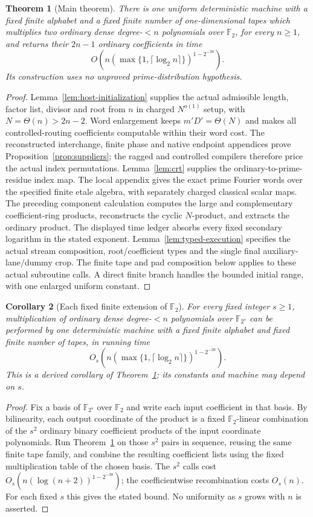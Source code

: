 \documentclass[11pt]{article}
\newtheorem{theorem}{Theorem}
\newtheorem{corollary}[theorem]{Corollary}
\newcommand{\F}{\mathbb F}
\begin{document}
\begin{theorem}[Main theorem]
\label{thm:main}
There is one uniform deterministic machine with a fixed finite alphabet
and a fixed finite number of one-dimensional tapes which multiplies two
ordinary dense degree-$<n$ polynomials over $\F_2$, for every $n\ge1$,
and returns their $2n-1$ ordinary coefficients in time
\[
 O\!\left(n(\max\{1,\lceil\log_2 n\rceil\})^{1-2^{-38}}\right).
\]
Its construction uses no unproved prime-distribution hypothesis.
\end{theorem}
\begin{proof}
Lemma~\ref{lem:host-initialization} supplies the actual admissible length,
factor list, divisor and root from $n$ in charged $N^{o(1)}$ setup,
with $N=\Theta(n)>2n-2$. Word enlargement keeps $m'D'=\Theta(N)$ and makes
all controlled-routing coefficients computable within their word cost.
The reconstructed interchange, finite phase and native endpoint
appendices prove Proposition~\ref{prop:suppliers}; the ragged and
controlled compilers therefore price the actual index permutations.
Lemma~\ref{lem:crt} supplies the ordinary-to-prime-residue index map.
The local appendix gives the exact prime Fourier words over the
specified finite etale algebra, with separately charged classical scalar
maps. The preceding component calculation computes the large and
complementary coefficient-ring products, reconstructs the cyclic
$N$-product, and extracts the ordinary product. The displayed time
ledger absorbs every fixed secondary logarithm in the stated exponent.
Lemma~\ref{lem:typed-execution} specifies the actual stream composition,
root/coefficient types and the single final auxiliary-lane/dummy crop.
The finite tape and pad composition below applies to these actual
subroutine calls. A direct finite branch handles the bounded initial
range, with one enlarged uniform constant.
\end{proof}

\begin{corollary}[Each fixed finite extension of $\F_2$]
For every fixed integer $s\ge 1$, multiplication of ordinary dense
degree-$<n$ polynomials over $\F_{2^s}$ can be performed by one
deterministic machine with a fixed finite alphabet and fixed finite
number of tapes, in running time
\[
 O_s\!\left(n(\max\{1,\lceil\log_2 n\rceil\})^{1-2^{-38}}\right).
\]
This is a derived corollary of Theorem~\ref{thm:main}; its constants and
machine may depend on $s$.
\end{corollary}
\begin{proof}
Fix a basis of $\F_{2^s}$ over $\F_2$ and write each input coefficient
in that basis. By bilinearity, each output coordinate of the product is
a fixed $\F_2$-linear combination of the $s^2$ ordinary binary
coefficient products of the input coordinate polynomials. Run
Theorem~\ref{thm:main} on those $s^2$ pairs in sequence, reusing the
same finite tape family, and combine the resulting coefficient lists
using the fixed multiplication table of the chosen basis. The $s^2$
calls cost $O_s(n(\log(n+2))^{1-2^{-38}})$; the coefficientwise
recombination costs $O_s(n)$. For each fixed $s$ this gives the stated
bound. No uniformity as $s$ grows with $n$ is asserted.
\end{proof}
\end{document}
